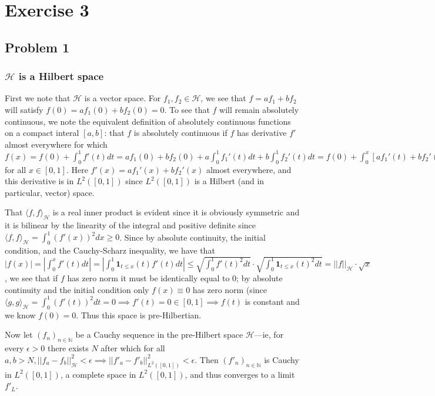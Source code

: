 \documentclass[12pt]{article}
\begin{document}

\section{Exercise 3}
\subsection{Problem 1}  
\subsubsection{$\mathcal{H}$ is a Hilbert space} First we note that $\mathcal{H}$ is a vector space. For $f_1, f_2 \in \mathcal{H}$, we see that $f = af_1 + bf_2$ will satisfy $f(0) = af_1(0)+bf_2(0) = 0$. To see that $f$ will remain absolutely continuous, we note the equivalent definition of absolutely continuous functions on a compact interal $[a,b]$: that $f$ is absolutely continuous if $f$ has derivative $f'$ almost everywhere for which $f(x) = f(0) + \int_0^1 f'(t) dt = af_1(0)+bf_2(0) + a \int_0^1 f_1'(t) dt + b \int_0^1 f_2'(t) dt = f(0) + \int_0^x [af_1'(t) + bf_2'(t)] dt$ for all $x \in [0,1]$. Here $f'(x) = af_1'(x) + bf_2'(x)$ almost everywhere, and this derivative is in $L^2([0,1])$ since $L^2([0,1])$ is a Hilbert (and in particular, vector) space.

That $\langle f, f \rangle_{\mathcal{H}}$ is a real inner product is evident since it is obviously symmetric and it is bilinear by the linearity of the integral and positive definite since $\langle f, f \rangle_{\mathcal{H}} = \int_{0}^1 (f'(x))^2 dx \geq 0$. Since by absolute continuity, the initial condition, and the Cauchy-Scharz inequality, we have that $|f(x)| = |\int_0^x f'(t)dt| = |\int_0^1 \mathbf{1}_{t\leq x}(t) f'(t) dt| \leq \sqrt{\int_0^1 f'(t)^2 dt} \cdot \sqrt{\int_0^1 \mathbf{1}_{t \leq x}(t)^2 dt}= ||f||_{\mathcal{H}} \cdot \sqrt{x}$, we see that if $f$ has zero norm it must be identically equal to 0; by absolute continuity and the initial condition only $f(x) \equiv 0$ has zero norm (since $\langle g, g \rangle_\mathcal{H} = \int_0^1 (f'(t))^2 dt = 0 \implies f'(t) = 0 \in [0,1] \implies f(t)$ is constant and we know $f(0) = 0$. Thus this space is pre-Hilbertian.

Now let $(f_n)_{n \in \mathbb{N}}$ be a Cauchy sequence in the pre-Hilbert space $\mathcal{H}$---ie, for every $\epsilon > 0$ there exists $N$ after which for all $a, b > N, ||f_a - f_b||^2_\mathcal{H} < \epsilon \implies ||f'_a - f'_b||^2_{L^2([0,1])} < \epsilon.$ Then $(f'_n)_{n \in \mathbb{N}}$ is Cauchy in $L^2([0,1])$, a complete space in $L^2([0,1])$, and thus converges to a limit $f'_L$.
\end{document}
